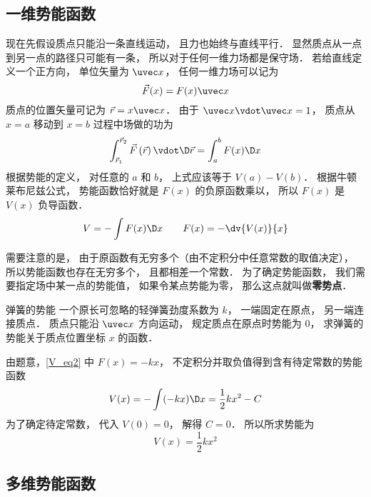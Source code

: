 \subsection{一维势能函数}

现在先假设质点只能沿一条直线运动， 且力也始终与直线平行． 显然质点从一点到另一点的路径只可能有一条， 所以对于任何一维力场都是保守场． 若给直线定义一个正方向， 单位矢量为 $\uvec x$， 任何一维力场可以记为
\begin{equation}\label{V_eq2}
\vec F(x) = F(x) \uvec x
\end{equation}
质点的位置矢量可记为 $\vec r = x \uvec x$． 由于 $\uvec x \vdot \uvec x = 1$， 质点从 $x = a$ 移动到 $x=b$ 过程中场做的功为
\begin{equation}
\int_{\vec r_1}^{\vec r_2} \vec F\left( {\vec r} \right) \vdot \D \vec r
= \int_a^b F(x) \D x
\end{equation}
根据势能的定义， 对任意的 $a$ 和 $b$， 上式应该等于 $V(a) - V(b)$． 根据牛顿莱布尼兹公式， 势能函数恰好就是 $F(x)$ 的负原函数乘以， 所以 $F(x)$ 是 $V(x)$ 负导函数．
\begin{equation}\label{V_eq8}
V = -\int F(x) \D x
\qquad
F(x) = -\dv{V(x)}{x}
\end{equation}

需要注意的是， 由于原函数有无穷多个（由不定积分中任意常数的取值决定）， 所以势能函数也存在无穷多个， 且都相差一个常数． 为了确定势能函数， 我们需要指定场中某一点的势能值， 如果令某点势能为零， 那么这点就叫做\textbf{零势点}．

\begin{exam}{弹簧的势能}
一个原长可忽略的轻弹簧劲度系数为 $k$， 一端固定在原点， 另一端连接质点． 质点只能沿 $\uvec x$ 方向运动， 规定质点在原点时势能为 $0$， 求弹簧的势能关于质点位置坐标 $x$ 的函数． 

由题意，\autoref{V_eq2} 中 $F(x) = -kx$， 不定积分并取负值得到含有待定常数的势能函数
\begin{equation}
V(x) = -\int (-kx) \D x = \frac 12 k x^2 - C
\end{equation}
为了确定待定常数， 代入 $V(0) = 0$， 解得 $C = 0$． 所以所求势能为
\begin{equation}
V(x) =  \frac 12 k x^2
\end{equation}
\end{exam}


\subsection{多维势能函数}

